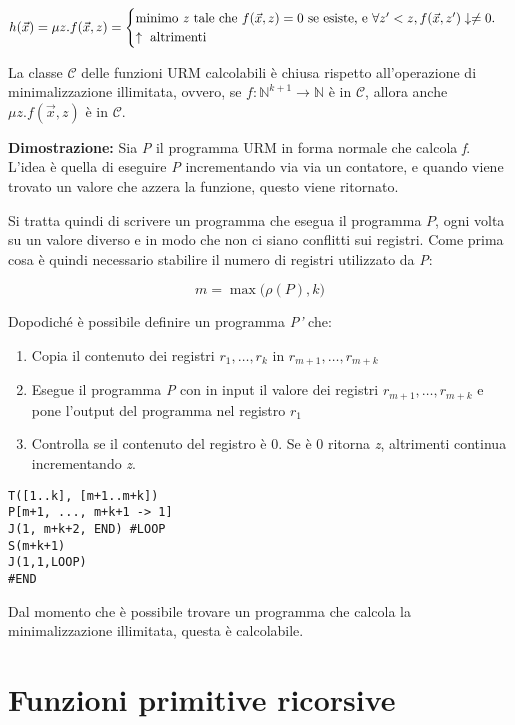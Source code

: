 $$
h(\vec{x}) = \mu z.f(\vec{x},z) = \begin{cases}
\text{minimo \textit{z} tale che }f(\vec{x},z) = 0 \text{ se esiste, e }\forall z' < z, f(\vec{x}, z') \downarrow \neq 0. \\
\uparrow \text{ altrimenti}
\end{cases}
$$

La classe $\mathcal{C}$ delle funzioni URM calcolabili è chiusa rispetto all'operazione di minimalizzazione illimitata, ovvero, se $f : \mathbb{N}^{k+1} \rightarrow \mathbb{N}$ è in $\mathcal{C}$, allora anche $\mu z . f(\vec{x},z)$ è in $\mathcal{C}$.

\textbf{Dimostrazione:} Sia \textit{P} il programma URM in forma normale che calcola \textit{f}. L'idea è quella di eseguire \textit{P} incrementando via via un contatore, e quando viene trovato un valore che azzera la funzione, questo viene ritornato.

Si tratta quindi di scrivere un programma che esegua il programma $P$, ogni volta su un valore diverso e in modo che non ci siano conflitti sui registri. Come prima cosa è quindi necessario stabilire il numero di registri utilizzato da \textit{P}:

$$
m = \max\big(\rho(P), k\big)
$$

Dopodiché è possibile definire un programma \textit{P'} che:

\begin{enumerate}
	\item Copia il contenuto dei registri $r_1, \ldots, r_k$ in $r_{m+1}, \ldots, r_{m+k}$
	\item Esegue il programma \textit{P} con in input il valore dei registri $r_{m+1}, \ldots, r_{m+k}$ e pone l'output del programma nel registro $r_1$
	\item Controlla se il contenuto del registro è 0. Se è 0 ritorna \textit{z}, altrimenti continua incrementando \textit{z}.
\end{enumerate}

\begin{lstlisting}[language=URM]
T([1..k], [m+1..m+k])
P[m+1, ..., m+k+1 -> 1]
J(1, m+k+2, END) #LOOP
S(m+k+1)
J(1,1,LOOP)
#END
\end{lstlisting}

Dal momento che è possibile trovare un programma che calcola la minimalizzazione illimitata, questa è calcolabile.

\section{Funzioni primitive ricorsive}

